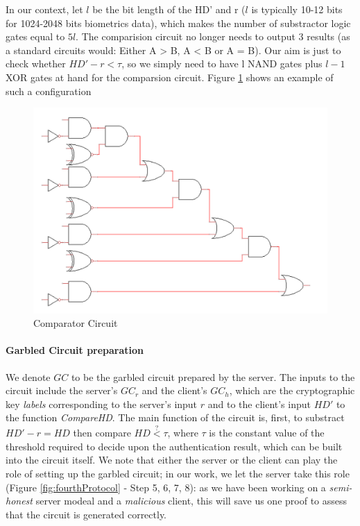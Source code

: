 In our context, let \(l\) be the bit length of the HD' and r (\(l\) is typically
10-12 bits for 1024-2048 bits biometrics data), which makes the number of
substractor logic gates equal to \(5l\). The comparision circuit no longer needs
to output 3 results (as a standard circuits would: Either A > B, A < B or A =
B). Our aim is just to check whether \(HD' - r < \tau\), so we simply need to
have l NAND gates plus \(l-1\) XOR gates at hand for the comparsion
circuit. Figure \ref{fig:comparisionCircuit1} shows an example of such a
configuration
\begin{figure}[htbp!] 
  \centering    
  \includegraphics[scale=0.75]{Chapter7/Figs/Raster/comparisionCircuit}
  \caption{Comparator Circuit}
  \label{fig:comparisionCircuit1}
\end{figure}

\paragraph{Garbled Circuit preparation}
We denote \(GC\) to be the garbled circuit prepared by the server. The inputs to
the circuit include the server's \(GC_{r}\) and the client's \(GC_{h}\), which
are the cryptographic key \textit{labels} corresponding to the server's input
\(r\) and to the client's input \(HD'\) to the function \textit{CompareHD}. The main
function of the circuit is, first, to substract \(HD' - r = HD\) then compare
\(HD \stackrel{?}{<} \tau\), where \(\tau\) is the constant value of the
threshold required to decide upon the authentication result, which can be built into the
circuit itself. We note that either the server or the client can play the role of
setting up the garbled circuit; in our work, we let the server take this role
(Figure \ref{fig:fourthProtocol} - Step 5, 6, 7, 8): as we have
been working on a \textit{semi-honest} server modeal and a \textit{malicious }
client, this will save us one proof to assess that the circuit is generated
correctly.

